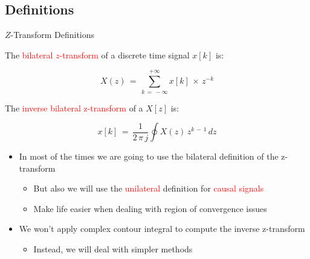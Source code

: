 \subsection{Definitions}
\begin{frame}[t,allowframebreaks]{$Z$-Transform Definitions}

\begin{definition}

The \textcolor{red}{bilateral $z$-transform} of a discrete time signal $x[k]$ is:

\begin{equation}
X(z) \, = \, \displaystyle\sum_{k \, = \, - \infty}^{+ \infty} x[k] \, \times \, z^{-k} 
\end{equation}

\end{definition}

\begin{definition}

The \textcolor{red}{inverse bilateral z-transform} of a $X[z]$ is:

\begin{equation}
x[k] \, = \, \displaystyle\frac{1}{2 \, \pi \, j} \displaystyle\oint X(z) \, z^{k \, - \, 1} \, dz
\end{equation}

\end{definition}

\newpage
\begin{itemize}

\item In most of the times we are going to use the bilateral definition of the z-transform

	\begin{itemize}
	\item But also we will use the \textcolor{red}{unilateral} definition for \textcolor{red}{causal signals}
	
	\item Make life easier when dealing with region of convergence issues
	\end{itemize}

\item We won't apply complex contour integral to compute the inverse z-transform

	\begin{itemize}
	\item Instead, we will deal with simpler methods 
	\end{itemize}

\end{itemize}

\end{frame}

